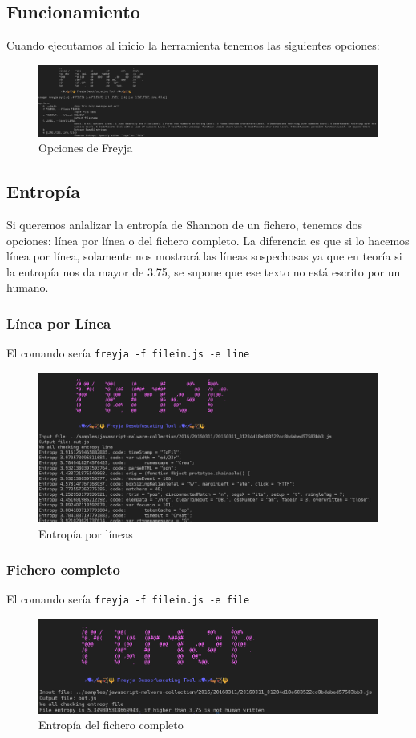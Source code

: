 \documentclass[15pt]{article}
\begin{document}
	\subsection{Funcionamiento}
	Cuando ejecutamos al inicio la herramienta tenemos las siguientes opciones:
	\begin{figure}[H]
		\centering
		\includegraphics[width=18cm]{images/usage.png}
		\caption{Opciones de Freyja}
	\end{figure}
	
	\subsection{Entropía}
	Si queremos anlalizar la entropía de Shannon de un fichero, tenemos dos opciones: línea por línea o del fichero completo.
	La diferencia es que si lo hacemos línea por línea, solamente nos mostrará las líneas sospechosas ya que en teoría si la entropía nos da mayor de 3.75, se supone que ese texto no está escrito por un humano.
	
	\subsubsection{Línea por Línea}
	El comando sería \verb*|freyja -f filein.js -e line|
	\begin{figure}[H]
		\centering
		\includegraphics[width=18cm]{images/line_entropy.png}
		\caption{Entropía por líneas}
	\end{figure}
	\subsubsection{Fichero completo}
		El comando sería \verb*|freyja -f filein.js -e file|
		\begin{figure}[H]
			\centering
			\includegraphics[width=18cm]{images/file_entropy.png}
			\caption{Entropía del fichero completo}
		\end{figure}
	
\end{document}
